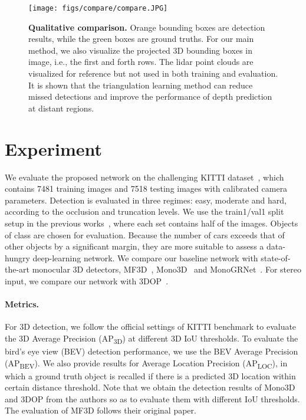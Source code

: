 







\begin{figure*}[ht] 
	\centering
	\scriptsize
	\texttt{[image: figs/compare/compare.JPG]}


\caption{\textbf{Qualitative comparison.} Orange bounding boxes are detection results, while the green boxes are ground truths. For our main method, we also visualize the projected 3D bounding boxes in image, i.e., the first and forth rows. The lidar point clouds are visualized for reference but not used in both training and evaluation. It is shown that the triangulation learning method can reduce missed detections and improve the performance of depth prediction at distant regions.}
	\label{fig:visualize3d}
\end{figure*}




\section{Experiment}
We evaluate the proposed network on the challenging KITTI dataset~\cite{geiger2012kitti}, which contains 7481 training images and 7518 testing images with calibrated camera parameters. Detection is evaluated in three regimes: easy, moderate and hard, according to the occlusion and truncation levels. We use the train1/val1 split setup in the previous works~\cite{chen2016monocular,chen2017multiview}, where each set contains half of the images. Objects of class  are chosen for evaluation. Because the number of cars exceeds that of other objects by a significant margin, they are more suitable to assess a data-hungry deep-learning network. We compare our baseline network with state-of-the-art monocular 3D detectors, MF3D~\cite{xu2018multifusion},  Mono3D~\cite{chen2016monocular} and MonoGRNet~\cite{qin2019monogr}. For stereo input, we compare our network with 3DOP~\cite{chen20153dop}. 

\paragraph{Metrics.}
For 3D detection, we follow the official settings of KITTI benchmark to evaluate the 3D Average Precision (AP\textsubscript{3D}) at different 3D IoU thresholds. To evaluate the bird's eye view (BEV) detection performance, we use the BEV Average Precision (AP\textsubscript{BEV}). We also provide results for Average Location Precision (AP\textsubscript{LOC}), in which a ground truth object is recalled if there is a predicted 3D location within certain distance threshold. Note that we obtain the detection results of Mono3D and 3DOP from the authors so as to evaluate them with different IoU thresholds. The evaluation of MF3D follows their original paper.





